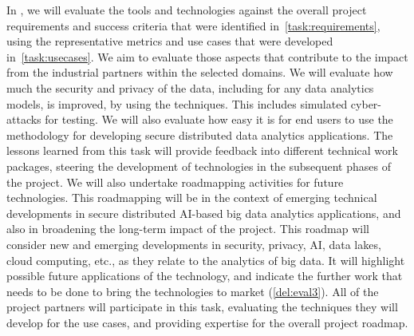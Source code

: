 \begin{Workpackage}{\thewpno}
\begin{Task}
\end{Task}

\begin{Task}
\TaskResults{%
\ref{del:eval1},
\ref{del:eval2},
\ref{del:eval3}
}
\TaskHeader{}
In \theTask{}, we will evaluate the \TheProject{} tools and technologies against the overall project requirements and success criteria that were identified in~\ref{task:requirements}, using the representative metrics and use cases that were developed in~\ref{task:usecases}. We aim to evaluate those aspects that contribute to the impact from the industrial partners within the selected domains. We will evaluate how much the security and privacy of the data, including for any data analytics models, is improved, by using the \TheProject{} techniques. This includes simulated cyber-attacks for testing. We will also evaluate how easy it is for end users to use the \TheProject{} methodology for developing secure distributed data analytics applications. The lessons learned from this task will provide feedback into different technical work packages, steering the development of \TheProject{} technologies in the subsequent phases of the project. We will also undertake roadmapping activities for future \TheProject{} technologies. This roadmapping will be in the context of emerging technical developments in  secure distributed AI-based big data analytics applications, and also in broadening the long-term impact of the \TheProject{} project. This roadmap will consider new and emerging developments in security, privacy, AI, data lakes, cloud computing, etc., as they relate to the analytics of big data. It will highlight possible future applications of the \TheProject{} technology, and indicate the further work that needs to be done to bring the \TheProject{} technologies to market (\ref{del:eval3}). All of the project partners will participate in this task, evaluating the techniques they will develop for the use cases, and providing expertise for the overall project roadmap.
  \end{Task}
  


\end{Workpackage}
